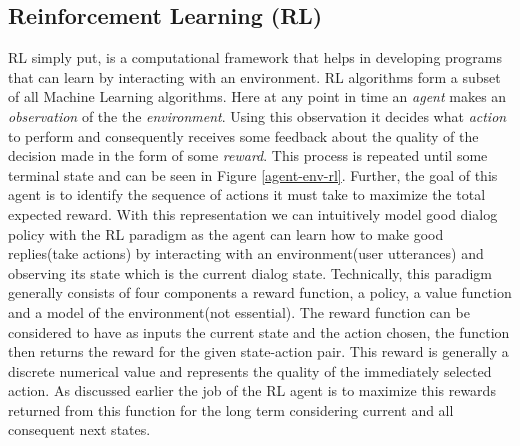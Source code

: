 \documentclass[14pt]{extarticle}
\numberwithin{equation}{section}
\begin{document}
	\subsection{Reinforcement Learning (RL)}
	RL simply put, is a computational framework that helps in developing programs that can learn by interacting with an environment. RL algorithms form a subset of all Machine Learning algorithms. Here at any point in time an \textit{agent} makes an \textit{observation} of the the \textit{environment}. Using this observation it decides what \textit{action} to perform and consequently receives some feedback about the quality of the decision made in the form of some \textit{reward}. This process is repeated until some terminal state and can be seen in Figure \ref{agent-env-rl}. Further, the goal of this agent is to identify the sequence of actions it must take to maximize the total expected reward. With this representation we can intuitively model good dialog policy with the RL paradigm as the agent can learn how to make good replies(take actions) by interacting with an environment(user utterances) and observing its state which is the current dialog state. Technically, this paradigm generally consists of four components a reward function, a policy, a value function and a model of the environment(not essential). The reward function can be considered to have as inputs the current state and the action chosen, the function then returns the reward for the given state-action pair. This reward is generally a discrete numerical value and represents the quality of the immediately selected action. As discussed earlier the job of the RL agent is to maximize this rewards returned from this function for the long term considering current and all consequent next states.
	
\end{document}
